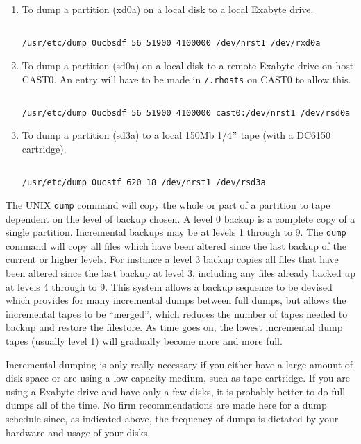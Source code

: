 \begin{enumerate}

\item To dump a partition (xd0a) on a local disk to a local Exabyte drive.

\begin{verbatim}

/usr/etc/dump 0ucbsdf 56 51900 4100000 /dev/nrst1 /dev/rxd0a

\end{verbatim}

\item To dump a partition (sd0a) on a local disk to a remote Exabyte drive on
host CAST0. An entry will have to be made in {\tt /.rhosts} on CAST0 to allow this.

\begin{verbatim}

/usr/etc/dump 0ucbsdf 56 51900 4100000 cast0:/dev/nrst1 /dev/rsd0a

\end{verbatim}

 \item To dump a partition (sd3a) to a local 150Mb 1/4$"$ tape (with a DC6150
cartridge).

\begin{verbatim}

/usr/etc/dump 0ucstf 620 18 /dev/nrst1 /dev/rsd3a

\end{verbatim}

\end{enumerate}

The UNIX {\tt dump} command will copy the whole or part of a partition to tape
dependent on the level of backup chosen. A level 0 backup is a complete
copy of a single partition. Incremental backups may be at levels 1 through
to 9. The {\tt dump} command will copy all files which have been altered since
the last backup of the current or higher levels. For instance a level 3
backup copies all files that have been altered since the last backup at level
3, including any files already backed up at levels 4 through to 9. This system
allows a backup sequence to be devised which provides for many incremental
dumps between full dumps, but allows the incremental tapes to be
``merged'', which reduces the number of tapes needed to backup and restore the
filestore. As time goes on, the lowest incremental dump tapes (usually level 1)
will gradually become more and more full.

Incremental dumping is only really necessary if you either have a large amount
of disk space or are using a low capacity medium, such as tape cartridge.
If you are using a Exabyte drive and have only a few disks, it is probably
better to do full dumps all of the time. No firm recommendations are made here
for a dump schedule since, as indicated above, the frequency of dumps is
dictated by your hardware and usage of your disks.

